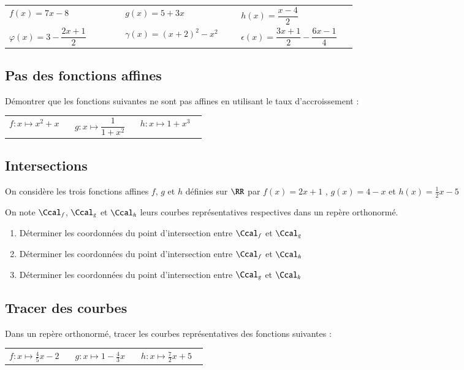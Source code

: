 \documentclass[oneside,12pt]{article}          %
\begin{document}
\renewcommand{\arraystretch}{2.25}
\begin{tabular}{p{0.3\linewidth} p{0.3\linewidth} p{0.3\linewidth}}
	$f(x)=7x-8$ & $g(x)=5+3x$ & $h(x)=\dfrac{x-4}{2}$ \\
	$\varphi(x)=3-\dfrac{2x+1}{2}$ & $\gamma(x)=(x+2)^2-x^2$ & $\epsilon(x)=\dfrac{3x+1}{2}-\dfrac{6x-1}{4}$
\end{tabular}



\subsection{Pas des fonctions affines}
Démontrer que les fonctions suivantes ne sont pas affines en utilisant le taux d'accroissement :

\begin{tabular}{p{0.3\linewidth} p{0.3\linewidth} p{0.3\linewidth}}
	$f:x\mapsto x^2+x$ & $g:x\mapsto\dfrac{1}{1+x^2}$ & $h:x\mapsto 1+x^3$
\end{tabular}



\subsection{Intersections}
On considère les trois fonctions affines $f$, $g$ et $h$ définies sur $\RR$ par $f(x)=2x+1$ , $g(x)=4-x$ et $h(x)=\frac{1}{2}x-5$

On note $\Ccal_f$, $\Ccal_g$ et $\Ccal_h$ leurs courbes représentatives respectives dans un repère orthonormé.
\begin{enumerate}
	\item Déterminer les coordonnées du point d'intersection entre $\Ccal_f$ et $\Ccal_g$
	\item Déterminer les coordonnées du point d'intersection entre $\Ccal_f$ et $\Ccal_h$
	\item Déterminer les coordonnées du point d'intersection entre $\Ccal_g$ et $\Ccal_h$
\end{enumerate}



\subsection{Tracer des courbes}
Dans un repère orthonormé, tracer les courbes représentatives des fonctions suivantes :

\begin{tabular}{p{0.3\linewidth} p{0.3\linewidth} p{0.3\linewidth}}
	$f:x\mapsto \frac{4}{5}x-2$ & $g:x\mapsto1-\frac{4}{3}x$ & $h:x\mapsto \frac{7}{2}x+5$
\end{tabular}
\end{document}
